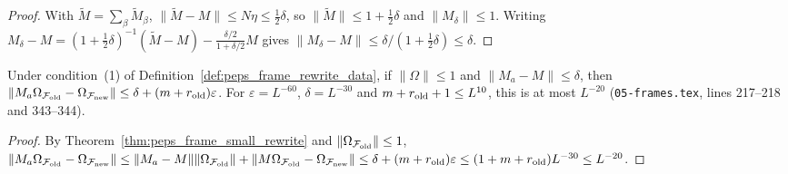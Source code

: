 \begin{proof}\leanok
    With $\widetilde M=\sum_\beta\widetilde M_\beta$, $\lVert\widetilde M-M\rVert\le N\eta\le\tfrac12\delta$, so
    $\lVert\widetilde M\rVert\le1+\tfrac12\delta$ and $\lVert M_\delta\rVert\le1$. Writing
    $M_\delta-M=(1+\tfrac12\delta)^{-1}(\widetilde M-M)
        -\tfrac{\delta/2}{1+\delta/2}M$ gives $\lVert M_\delta-M\rVert\le\delta/(1+\tfrac12\delta)\le\delta$.
\end{proof}

\begin{lemma}
    \label{lem:peps_frame_approx_reference}
    \leanok
    Under condition~(1) of Definition~\ref{def:peps_frame_rewrite_data}, if $\lVert\Omega\rVert\le1$ and
    $\lVert M_a-M\rVert\le\delta$, then
    $\lVert M_a\Omega_{\mathcal F_{\rm old}}-\Omega_{\mathcal F_{\rm new}}\rVert
        \le\delta+(m+r_{\rm old})\varepsilon$. For $\varepsilon=L^{-60}$,
    $\delta=L^{-30}$ and $m+r_{\rm old}+1\le L^{10}$, this is at most
    $L^{-20}$ (\texttt{05-frames.tex}, lines 217--218 and 343--344).
\end{lemma}

\begin{proof}\leanok
    By Theorem~\ref{thm:peps_frame_small_rewrite} and $\lVert\Omega_{\mathcal F_{\rm old}}\rVert\le1$,
    $\lVert M_a\Omega_{\mathcal F_{\rm old}}-\Omega_{\mathcal F_{\rm new}}\rVert\le\lVert M_a-M\rVert\lVert\Omega_{\mathcal F_{\rm old}}\rVert+\lVert M\Omega_{\mathcal F_{\rm old}}-\Omega_{\mathcal F_{\rm new}}\rVert\le\delta+(m+r_{\rm old})\varepsilon\le(1+m+r_{\rm old})L^{-30}\le L^{-20}$.
\end{proof}

